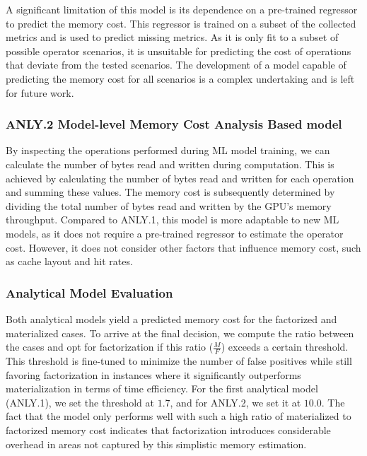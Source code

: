 A significant limitation of this model is its dependence on a pre-trained regressor to predict the memory cost. This regressor is trained on a subset of the collected metrics and is used to predict missing metrics. As it is only fit to a subset of possible operator scenarios, it is unsuitable for predicting the cost of operations that deviate from the tested scenarios. The development of a model capable of predicting the memory cost for all scenarios is a complex undertaking and is left for future work.

\subsubsection*{ANLY.2 Model-level Memory Cost Analysis Based model}
By inspecting the operations performed during ML model training, we can calculate the number of bytes read and written during computation. This is achieved by calculating the number of bytes read and written for each operation and summing these values. The memory cost is subsequently determined by dividing the total number of bytes read and written by the GPU’s memory throughput. Compared to ANLY.1, this model is more adaptable to new ML models, as it does not require a pre-trained regressor to estimate the operator cost. However, it does not consider other factors that influence memory cost, such as cache layout and hit rates.

\subsubsection{Analytical Model Evaluation}
Both analytical models yield a predicted memory cost for the factorized and materialized cases. To arrive at the final decision, we compute the ratio between the cases and opt for factorization if this ratio ($\frac{M}{F}$) exceeds a certain threshold. This threshold is fine-tuned to minimize the number of false positives while still favoring factorization in instances where it significantly outperforms materialization in terms of time efficiency. For the first analytical model (ANLY.1), we set the threshold at $1.7$, and for ANLY.2, we set it at $10.0$. The fact that the model only performs well with such a high ratio of materialized to factorized memory cost indicates that factorization introduces considerable overhead in areas not captured by this simplistic memory estimation.

